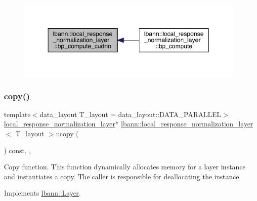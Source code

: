 \begin{figure}[H]
\begin{center}
\leavevmode
\includegraphics[width=343pt]{classlbann_1_1local__response__normalization__layer_a78b0d081956abf4f09874d59b4bf4fc8_icgraph}
\end{center}
\end{figure}
\mbox{\label{classlbann_1_1local__response__normalization__layer_a2bccec49f9b3840a2d9170cb202c1397}} 
\subsubsection{\texorpdfstring{copy()}{copy()}}
{\footnotesize\ttfamily template$<$data\+\_\+layout T\+\_\+layout = data\+\_\+layout\+::\+D\+A\+T\+A\+\_\+\+P\+A\+R\+A\+L\+L\+EL$>$ \\
\hyperlink{classlbann_1_1local__response__normalization__layer}{local\+\_\+response\+\_\+normalization\+\_\+layer}$\ast$ \hyperlink{classlbann_1_1local__response__normalization__layer}{lbann\+::local\+\_\+response\+\_\+normalization\+\_\+layer}$<$ T\+\_\+layout $>$\+::copy (\begin{DoxyParamCaption}{ }\end{DoxyParamCaption}) const\hspace{0.3cm}{\ttfamily [inline]}, {\ttfamily [override]}, {\ttfamily [virtual]}}

Copy function. This function dynamically allocates memory for a layer instance and instantiates a copy. The caller is responsible for deallocating the instance. 

Implements \hyperlink{classlbann_1_1Layer_af420f22bbac801c85483ade84588a23f}{lbann\+::\+Layer}.




